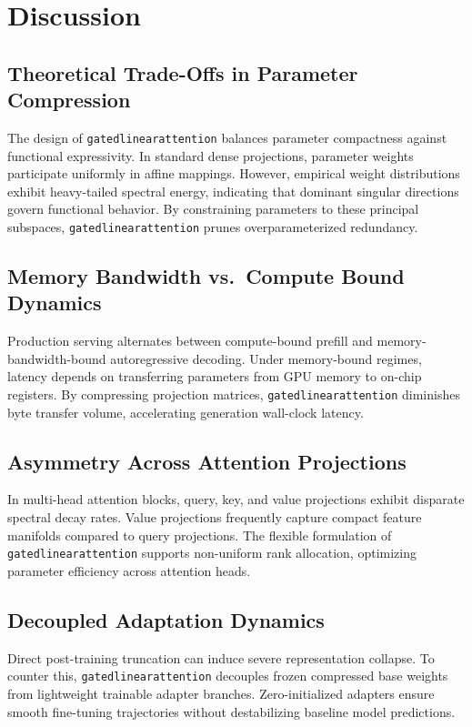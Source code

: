 \section{Discussion}

\subsection{Theoretical Trade-Offs in Parameter Compression}
The design of \texttt{gatedlinearattention} balances parameter compactness against functional expressivity. In standard dense projections, parameter weights participate uniformly in affine mappings. However, empirical weight distributions exhibit heavy-tailed spectral energy, indicating that dominant singular directions govern functional behavior. By constraining parameters to these principal subspaces, \texttt{gatedlinearattention} prunes overparameterized redundancy.

\subsection{Memory Bandwidth vs.\ Compute Bound Dynamics}
Production serving alternates between compute-bound prefill and memory-bandwidth-bound autoregressive decoding. Under memory-bound regimes, latency depends on transferring parameters from GPU memory to on-chip registers. By compressing projection matrices, \texttt{gatedlinearattention} diminishes byte transfer volume, accelerating generation wall-clock latency.

\subsection{Asymmetry Across Attention Projections}
In multi-head attention blocks, query, key, and value projections exhibit disparate spectral decay rates. Value projections frequently capture compact feature manifolds compared to query projections. The flexible formulation of \texttt{gatedlinearattention} supports non-uniform rank allocation, optimizing parameter efficiency across attention heads.

\subsection{Decoupled Adaptation Dynamics}
Direct post-training truncation can induce severe representation collapse. To counter this, \texttt{gatedlinearattention} decouples frozen compressed base weights from lightweight trainable adapter branches. Zero-initialized adapters ensure smooth fine-tuning trajectories without destabilizing baseline model predictions.

